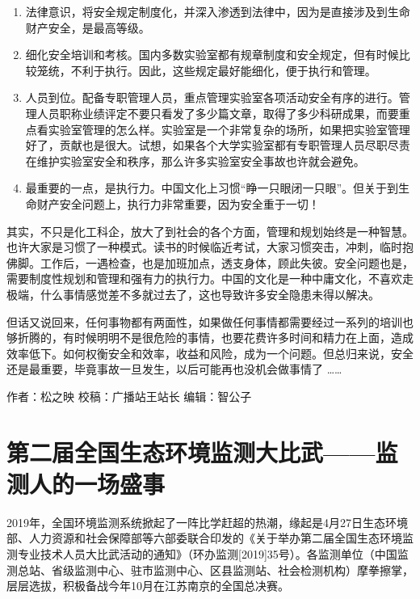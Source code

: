 \documentclass[]{book}
\begin{document}
\begin{enumerate}
\def\labelenumi{\arabic{enumi}.}
\item
  法律意识，将安全规定制度化，并深入渗透到法律中，因为是直接涉及到生命财产安全，是最高等级。
\item
  细化安全培训和考核。国内多数实验室都有规章制度和安全规定，但有时候比较笼统，不利于执行。因此，这些规定最好能细化，便于执行和管理。
\item
  人员到位。配备专职管理人员，重点管理实验室各项活动安全有序的进行。管理人员职称业绩评定不要只看发了多少篇文章，取得了多少科研成果，而要重点看实验室管理的怎么样。实验室是一个非常复杂的场所，如果把实验室管理好了，贡献也是很大。试想，如果各个大学实验室都有专职管理人员尽职尽责在维护实验室安全和秩序，那么许多实验室安全事故也许就会避免。
\item
  最重要的一点，是执行力。中国文化上习惯``睁一只眼闭一只眼''。但关于到生命财产安全问题上，执行力非常重要，因为安全重于一切！
\end{enumerate}

其实，不只是化工科企，放大了到社会的各个方面，管理和规划始终是一种智慧。也许大家是习惯了一种模式。读书的时候临近考试，大家习惯突击，冲刺，临时抱佛脚。工作后，一遇检查，也是加班加点，透支身体，顾此失彼。安全问题也是，需要制度性规划和管理和强有力的执行力。中国的文化是一种中庸文化，不喜欢走极端，什么事情感觉差不多就过去了，这也导致许多安全隐患未得以解决。

但话又说回来，任何事物都有两面性，如果做任何事情都需要经过一系列的培训也够折腾的，有时候明明不是很危险的事情，也要花费许多时间和精力在上面，造成效率低下。如何权衡安全和效率，收益和风险，成为一个问题。但总归来说，安全还是最重要，毕竟事故一旦发生，以后可能再也没机会做事情了 \ldots{}\ldots{}

作者：松之映
校稿：广播站王站长
编辑：智公子

\hypertarget{ux7b2cux4e8cux5c4aux5168ux56fdux751fux6001ux73afux5883ux76d1ux6d4bux5927ux6bd4ux6b66ux76d1ux6d4bux4ebaux7684ux4e00ux573aux76dbux4e8b}{%
\section{第二届全国生态环境监测大比武------监测人的一场盛事}\label{ux7b2cux4e8cux5c4aux5168ux56fdux751fux6001ux73afux5883ux76d1ux6d4bux5927ux6bd4ux6b66ux76d1ux6d4bux4ebaux7684ux4e00ux573aux76dbux4e8b}}

2019年，全国环境监测系统掀起了一阵比学赶超的热潮，缘起是4月27日生态环境部、人力资源和社会保障部等六部委联合印发的《关于举办第二届全国生态环境监测专业技术人员大比武活动的通知》（环办监测{[}2019{]}35号）。各监测单位（中国监测总站、省级监测中心、驻市监测中心、区县监测站、社会检测机构）摩拳擦掌，层层选拔，积极备战今年10月在江苏南京的全国总决赛。
\end{document}
